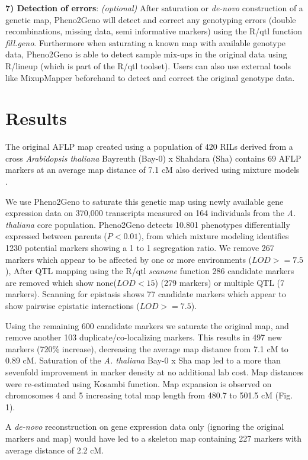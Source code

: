 {\bf 7) Detection of errors}: \emph{(optional)}
After saturation or \emph{de-novo} construction of a genetic map, Pheno2Geno will detect and 
correct any genotyping errors (double recombinations, missing data, semi informative markers) 
using the R/qtl function \emph{fill.geno}. Furthermore when saturating a known map with available 
genotype data, Pheno2Geno is able to detect sample mix-ups in the original data using R/lineup 
(which is part of the R/qtl toolset). Users can also use external tools like MixupMapper \cite{Westra:2011} 
beforehand to detect and correct the original genotype data.

\section{Results}
The original AFLP map created using a population of 420 RILs derived from a cross \emph{Arabidopsis 
thaliana} Bayreuth (Bay-0) x Shahdara (Sha) \cite{Loudet:2002} contains 69 AFLP markers at an 
average map distance of 7.1 cM also derived using mixture models \cite{Jansen:2001b, Loudet:2002}.

We use Pheno2Geno to saturate this genetic map using newly available gene expression data on 
370,000 transcripts measured on 164 individuals from the \emph{A. thaliana} core population. 
Pheno2Geno detects 10.801 phenotypes differentially expressed between parents ($P < 0.01$), from 
which mixture modeling identifies 1230 potential markers showing a 1 to 1 segregation ratio. We 
remove 267 markers which appear to be affected by one or more environments ($LOD >= 7.5$), 
After QTL mapping using the R/qtl \emph{scanone} function 286 candidate markers are removed 
which show none($LOD < 15$) (279 markers) or multiple QTL (7 markers). Scanning for epistasis 
shows 77 candidate markers which appear to show pairwise epistatic interactions ($LOD >= 7.5$). 

Using the remaining 600 candidate markers we saturate the original map, and remove another 103 
duplicate/co-localizing markers. This results in 497 new markers (720\% increase), decreasing 
the average map distance from 7.1 cM to 0.89 cM. Saturation of the \emph{A. thaliana} Bay-0 x 
Sha map led to a more than sevenfold improvement in marker density at no additional lab cost. Map 
distances were re-estimated using Kosambi function. Map expansion is observed on chromosomes 4 
and 5 increasing total map length from 480.7 to 501.5 cM (Fig. 1). 

A \emph{de-novo} reconstruction on gene expression data only (ignoring the original markers and map) 
would have led to a skeleton map containing 227 markers with average distance of 2.2 cM.

